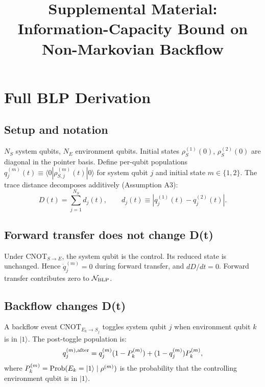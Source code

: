 \documentclass[aps,prl,twocolumn]{revtex4-2}
\begin{document}
\title{Supplemental Material:\\
Information-Capacity Bound on Non-Markovian Backflow}

\maketitle

\section{Full BLP Derivation}

\subsection{Setup and notation}

$N_S$ system qubits, $N_E$ environment qubits. Initial states $\rho_S^{(1)}(0)$, $\rho_S^{(2)}(0)$ are diagonal in the pointer basis. Define per-qubit populations $q_j^{(m)}(t) \equiv \langle 0|\rho_{S,j}^{(m)}(t)|0\rangle$ for system qubit $j$ and initial state $m \in \{1,2\}$. The trace distance decomposes additively (Assumption A3):
\begin{equation}
D(t) = \sum_{j=1}^{N_S} d_j(t), \qquad d_j(t) \equiv |q_j^{(1)}(t) - q_j^{(2)}(t)|.
\end{equation}

\subsection{Forward transfer does not change D(t)}

Under CNOT$_{S\to E}$, the system qubit is the control. Its reduced state is unchanged. Hence $\dot{q}_j^{(m)} = 0$ during forward transfer, and $dD/dt = 0$. Forward transfer contributes zero to $\mathcal{N}_{\rm BLP}$.

\subsection{Backflow changes D(t)}

A backflow event CNOT$_{E_k \to S_j}$ toggles system qubit $j$ when environment qubit $k$ is in $|1\rangle$. The post-toggle population is:
\begin{equation}
q_j^{(m),{\rm after}} = q_j^{(m)}(1 - P_k^{(m)}) + (1 - q_j^{(m)}) P_k^{(m)},
\end{equation}
where $P_k^{(m)} = {\rm Prob}(E_k = |1\rangle \mid \rho^{(m)})$ is the probability that the controlling environment qubit is in $|1\rangle$.
\end{document}
